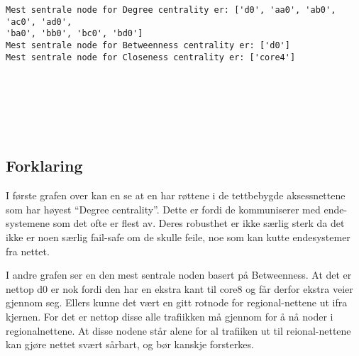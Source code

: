 \documentclass[11pt]{article}
\begin{document}
    \begin{Verbatim}[commandchars=\\\{\}]
Mest sentrale node for Degree centrality er: ['d0', 'aa0', 'ab0', 'ac0', 'ad0',
'ba0', 'bb0', 'bc0', 'bd0']
Mest sentrale node for Betweenness centrality er: ['d0']
Mest sentrale node for Closeness centrality er: ['core4']
    \end{Verbatim}

    \begin{center}
    \end{center}
    { \hspace*{\fill} \\}
    
    \begin{center}
    \end{center}
    { \hspace*{\fill} \\}
    
    \begin{center}
    \end{center}
    { \hspace*{\fill} \\}
    
    \hypertarget{forklaring}{%
\subsection*{Forklaring}\label{forklaring}}

I første grafen over kan en se at en har røttene i de tettbebygde
aksessnettene som har høyest ``Degree centrality''. Dette er fordi de
kommuniserer med ende-systemene som det ofte er flest av. Deres
robusthet er ikke særlig sterk da det ikke er noen særlig fail-safe om
de skulle feile, noe som kan kutte endesystemer fra nettet.

I andre grafen ser en den mest sentrale noden basert på Betweenness. At
det er nettop d0 er nok fordi den har en ekstra kant til core8 og får
derfor ekstra veier gjennom seg. Ellers kunne det vært en gitt rotnode
for regional-nettene ut ifra kjernen. For det er nettop disse alle
trafiikken må gjennom for å nå noder i regionalnettene. At disse nodene
står alene for al trafiiken ut til reional-nettene kan gjøre nettet
svært sårbart, og bør kanskje forsterkes.
\end{document}
